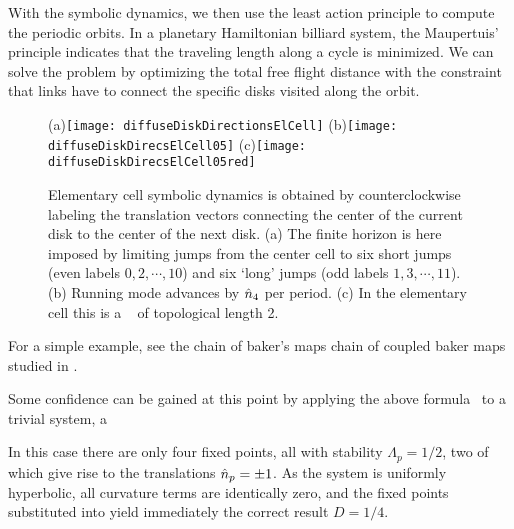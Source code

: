 With the symbolic dynamics, we then use the least action principle to
compute the periodic orbits. In a planetary Hamiltonian
billiard system, the Maupertuis' principle indicates that the
traveling length along a cycle is minimized. We can solve the problem
by optimizing the total free flight distance with the constraint that
links have to connect the specific disks visited along the orbit.


\begin{figure}
  \begin{center}
    (a)\texttt{[image: diffuseDiskDirectionsElCell]}
    (b)\texttt{[image: diffuseDiskDirecsElCell05]}
    (c)\texttt{[image: diffuseDiskDirecsElCell05red]}
  \end{center}
  \caption{\label{fig-diskDirectionsElCell}
  Elementary cell symbolic dynamics is obtained by counterclockwise
  labeling the translation vectors connecting the center of the current
  disk to the center of  the next disk. (a) The finite horizon is here
  imposed by limiting jumps from  the center cell to six short jumps
  (even labels $0, 2,\cdots,10$) and six `long' jumps (odd labels $1,
  3,\cdots,11$). (b) Running mode   advances by $\hat{n}_4$ per
  period. (c) In the elementary cell this is  a \po\  of
  topological length 2.
  }
\end{figure}


For a simple example, see the chain of baker's maps chain of coupled
baker maps studied in .

Some confidence can be gained at this point by applying the above
formula~ to a trivial system, a

In this case there are only four fixed points, all with
stability $\Lambda_p=1/2$, two of
which give rise to the translations $\hat{n}_{p}=\pm 1$.
As the system is
uniformly hyperbolic, all curvature terms are identically zero,
and the fixed points substituted into  yield
immediately the correct result $D=1/4$.
